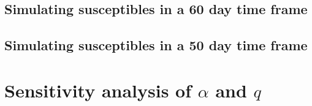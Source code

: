 \subsection{Simulating susceptibles in a 60 day time frame}


\subsection{Simulating susceptibles in a 50 day time frame}



\section{Sensitivity analysis of $\alpha$ and $q$}

